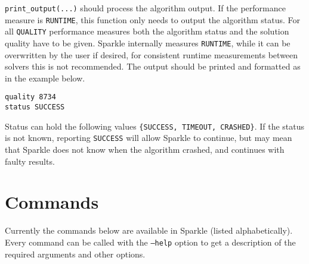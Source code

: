 \documentclass{article}
\begin{document}
\texttt{print\_output(...)} should process the algorithm output. If the performance measure is \texttt{RUNTIME}, this function only needs to output the algorithm status. For all \texttt{QUALITY} performance measures both the algorithm status and the solution quality have to be given. Sparkle internally measures \texttt{RUNTIME}, while it can be overwritten by the user if desired, for consistent runtime measurements between solvers this is not recommended. The output should be printed and formatted as in the example below.

\begin{verbatim}
quality 8734
status SUCCESS
\end{verbatim}

Status can hold the following values \texttt{\{SUCCESS, TIMEOUT, CRASHED\}}. If the status is not known, reporting \texttt{SUCCESS} will allow Sparkle to continue, but may mean that Sparkle does not know when the algorithm crashed, and continues with faulty results.

\section{Commands}

Currently the commands below are available in Sparkle (listed alphabetically). Every command can be called with the \texttt{--help} option to get a description of the required arguments and other options.
\end{document}
